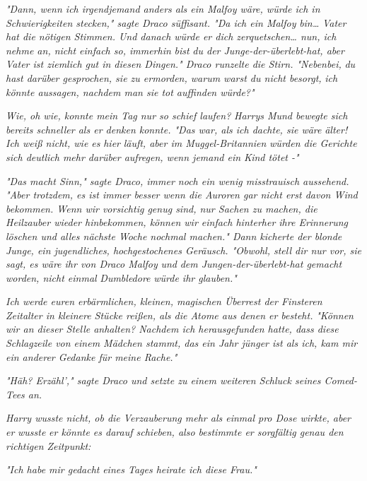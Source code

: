 {\emph{"Dann, wenn ich irgendjemand anders als ein Malfoy wäre, würde ich in Schwierigkeiten stecken," sagte Draco süffisant. "Da ich ein Malfoy} \emph{\emph{bin…}} \emph{Vater hat die nötigen Stimmen. Und danach würde er dich zerquetschen… nun, ich nehme an, nicht einfach so, immerhin} \emph{\emph{bist}} \emph{du der Junge-der-überlebt-hat, aber Vater ist ziemlich gut in diesen Dingen." Draco runzelte die Stirn. "Nebenbei,} \emph{\emph{du}} \emph{hast darüber gesprochen, sie zu ermorden, warum warst du nicht besorgt,} \emph{\emph{ich}} \emph{könnte aussagen, nachdem man sie tot auffinden würde?"}

\emph{\emph{Wie, oh wie, konnte mein Tag nur so schief laufen?}} \emph{Harrys Mund bewegte sich bereits schneller als er denken konnte. "Das war, als ich dachte, sie wäre} \emph{\emph{älter!}} \emph{Ich weiß nicht, wie es} \emph{\emph{hier}} \emph{läuft, aber im Muggel-Britannien} \emph{würden die Gerichte sich deutlich mehr darüber aufregen, wenn jemand ein Kind tötet -"}

\emph{"Das macht Sinn," sagte Draco, immer noch ein wenig misstrauisch aussehend. "Aber trotzdem, es ist immer besser wenn die Auroren gar nicht erst davon Wind bekommen. Wenn wir vorsichtig genug sind, nur Sachen zu machen, die Heilzauber wieder hinbekommen, können wir einfach hinterher ihre Erinnerung löschen und alles nächste Woche nochmal machen." Dann kicherte der blonde Junge, ein jugendliches, hochgestochenes Geräusch. "Obwohl, stell dir nur vor, sie sagt, es wäre ihr von Draco Malfoy} \emph{\emph{und}} \emph{dem Jungen-der-überlebt-hat gemacht worden, nicht einmal} \emph{\emph{Dumbledore}} \emph{würde ihr glauben."}

\emph{\emph{Ich werde euren erbärmlichen, kleinen, magischen Überrest der Finsteren Zeitalter in kleinere Stücke reißen, als die Atome aus denen er besteht.}} \emph{"Können wir an dieser Stelle anhalten? Nachdem ich herausgefunden hatte, dass diese Schlagzeile von einem Mädchen stammt, das ein Jahr jünger ist als ich, kam mir ein anderer Gedanke für meine Rache."}

\emph{"Häh? Erzähl'," sagte Draco und setzte zu einem weiteren Schluck seines Comed-Tees an.}

\emph{Harry wusste nicht, ob die Verzauberung mehr als einmal pro Dose wirkte, aber er} \emph{\emph{wusste}} \emph{er könnte es darauf schieben, also bestimmte er sorgfältig genau den richtigen Zeitpunkt:}

\emph{"Ich habe mir gedacht} \emph{\emph{eines Tages heirate ich diese Frau.}"}

}
